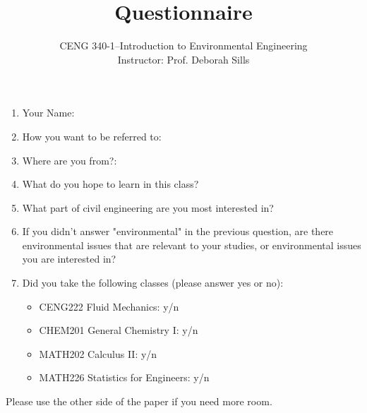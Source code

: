 \documentclass[12pt,letterpaper]{article}
\begin{document}
\setlength{\parindent}{0cm} 


\frenchspacing

\title {Questionnaire} 
\author {CENG 340-1--Introduction to Environmental Engineering\\
Instructor: Prof. Deborah Sills}
\maketitle
\begin{enumerate}
\item Your Name:
\item How you want to be referred to:
\item Where are you from?:\\
\item What do you hope to learn in this class?\\
\vspace{1 in}
\item What part of civil engineering are you most interested in?\\
\vspace{0.5 in}
\item If you didn't answer "environmental" in the previous question, are there environmental issues that are relevant to your studies, or environmental issues you are interested in?\\ 
\vspace{0.6 in}
\item Did you take the following classes (please answer yes or no):
\begin{itemize}
\item CENG222 Fluid Mechanics: y/n
\item CHEM201 General Chemistry I: y/n
\item MATH202 Calculus II: y/n
\item MATH226 Statistics for Engineers: y/n
\end{itemize}

\end{enumerate}
\vspace{0.2 in}
Please use the other side of the paper if you need more room.
\end{document}
